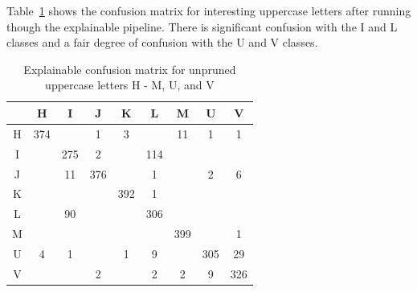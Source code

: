 \documentclass[conference]{IEEEtran}
\begin{document}
\begin{table}
    \centering
    \caption{Explainable accuracy results on various balanced EMNIST data sets with differing NN models}
    \label{tab_explainable accuracy_results}
\end{table}

Table~\ref{raw_cap_confusion_matrix} shows the confusion matrix for interesting
uppercase letters after running though the explainable pipeline. There is
significant confusion with the I and L classes and a fair degree of confusion
with the U and V classes.


\begin{table}
    \centering
    \caption{Explainable confusion matrix for unpruned uppercase letters H - M, U, and V}
    \begin{tabular}{ |c|c|c|c|c|c|c|c|c|}
    \hline
     & H & I & J & K & L & M & U & V \\
    \hline
    H & 374 &  & 1 & 3 &  & 11 & 1 & 1 \\
    \hline
    I &  & 275 & 2 & & 114 & & & \\
    \hline
    J &  & 11 & 376 & & 1 & & 2 & 6 \\
    \hline
    K &  &  &  & 392 & 1 & & & \\
    \hline
    L &  & 90 &  &  & 306 & & & \\
    \hline
    M &  &  &  &  &  & 399 & & 1 \\
    \hline
    U & 4 & 1 & & 1 & 9 & & 305 & 29 \\
    \hline
    V & & & 2 & & 2 & 2 & 9 & 326 \\
    \hline
    \end{tabular}
    \label{raw_cap_confusion_matrix}
\end{table}
\end{document}

